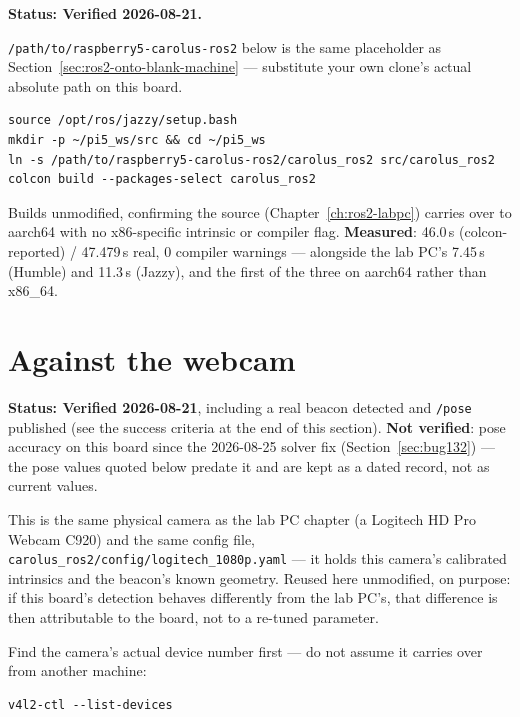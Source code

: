\documentclass[11pt]{report}
\begin{document}
\textbf{Status: Verified 2026-08-21.}

\texttt{/path/to/raspberry5-carolus-ros2} below is the same placeholder as
Section~\ref{sec:ros2-onto-blank-machine} --- substitute your own clone's
actual absolute path on this board.

\begin{lstlisting}[style=shell]
source /opt/ros/jazzy/setup.bash
mkdir -p ~/pi5_ws/src && cd ~/pi5_ws
ln -s /path/to/raspberry5-carolus-ros2/carolus_ros2 src/carolus_ros2
colcon build --packages-select carolus_ros2
\end{lstlisting}

Builds unmodified, confirming the source (Chapter~\ref{ch:ros2-labpc}) carries
over to aarch64 with no x86-specific intrinsic or compiler flag. \textbf{Measured}:
46.0\,s (colcon-reported) / 47.479\,s real, 0 compiler warnings ---
alongside the lab PC's 7.45\,s (Humble) and 11.3\,s (Jazzy), and the first of
the three on aarch64 rather than x86\_64.

\section{Against the webcam}
\label{sec:ros2-pi5-webcam}

\textbf{Status: Verified 2026-08-21}, including a real beacon detected and
\texttt{/pose} published (see the success criteria at the end of this
section). \textbf{Not verified}: pose accuracy on this board since the
2026-08-25 solver fix (Section~\ref{sec:bug132}) --- the pose values quoted
below predate it and are kept as a dated record, not as current values.

This is the same physical camera as the lab PC chapter (a Logitech HD Pro
Webcam C920) and the same config file,
\texttt{carolus\_ros2/\allowbreak config/\allowbreak logitech\_1080p.yaml}
--- it holds this camera's calibrated intrinsics and the beacon's known
geometry. Reused here unmodified, on purpose: if this board's detection
behaves differently from the lab PC's, that difference is then attributable
to the board, not to a re-tuned parameter.

Find the camera's actual device number first --- do not assume it carries
over from another machine:

\begin{lstlisting}[style=shell]
v4l2-ctl --list-devices
\end{lstlisting}
\end{document}
